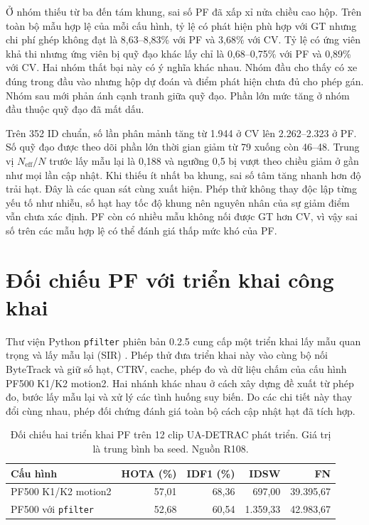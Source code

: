 Ở nhóm thiếu từ ba đến tám khung, sai số PF đã xấp xỉ nửa chiều cao hộp. Trên toàn bộ mẫu hợp lệ của mỗi cấu hình, tỷ lệ có phát hiện phù hợp với GT nhưng chi phí ghép không đạt là 8,63--8,83\% với PF và 3,68\% với CV. Tỷ lệ có ứng viên khả thi nhưng ứng viên bị quỹ đạo khác lấy chỉ là 0,68--0,75\% với PF và 0,89\% với CV. Hai nhóm thất bại này có ý nghĩa khác nhau. Nhóm đầu cho thấy có xe đúng trong đầu vào nhưng hộp dự đoán và điểm phát hiện chưa đủ cho phép gán. Nhóm sau mới phản ánh cạnh tranh giữa quỹ đạo. Phần lớn mức tăng ở nhóm đầu thuộc quỹ đạo đã mất dấu.

Trên 352 ID chuẩn, số lần phân mảnh tăng từ 1.944 ở CV lên 2.262--2.323 ở PF. Số quỹ đạo được theo dõi phần lớn thời gian giảm từ 79 xuống còn 46--48. Trung vị $N_{\mathrm{eff}}/N$ trước lấy mẫu lại là 0,188 và ngưỡng 0,5 bị vượt theo chiều giảm ở gần như mọi lần cập nhật. Khi thiếu ít nhất ba khung, sai số tâm tăng nhanh hơn độ trải hạt. Đây là các quan sát cùng xuất hiện. Phép thử không thay độc lập từng yếu tố như nhiễu, số hạt hay tốc độ khung nên nguyên nhân của sự giảm điểm vẫn chưa xác định. PF còn có nhiều mẫu không nối được GT hơn CV, vì vậy sai số trên các mẫu hợp lệ có thể đánh giá thấp mức khó của PF.

\section{Đối chiếu PF với triển khai công khai}
Thư viện Python \texttt{pfilter} phiên bản 0.2.5 cung cấp một triển khai lấy mẫu quan trọng và lấy mẫu lại (SIR) \cite{pfilter}. Phép thử đưa triển khai này vào cùng bộ nối ByteTrack và giữ số hạt, CTRV, cache, phép đo và dữ liệu chấm của cấu hình PF500 K1/K2 motion2. Hai nhánh khác nhau ở cách xây dựng đề xuất từ phép đo, bước lấy mẫu lại và xử lý các tình huống suy biến. Do các chi tiết này thay đổi cùng nhau, phép đối chứng đánh giá toàn bộ cách cập nhật hạt đã tích hợp.

\begin{table}[htbp]\centering\small
\caption{Đối chiếu hai triển khai PF trên 12 clip UA-DETRAC phát triển. Giá trị là trung bình ba seed. Nguồn R108.}\label{tab:pf-public}
\begin{tabular}{lrrrr}\toprule
Cấu hình & HOTA (\%) & IDF1 (\%) & IDSW & FN\\\midrule
PF500 K1/K2 motion2 & 57,01 & 68,36 & 697,00 & 39.395,67\\
PF500 với \texttt{pfilter} & 52,68 & 60,54 & 1.359,33 & 42.983,67\\\bottomrule
\end{tabular}
\end{table}

